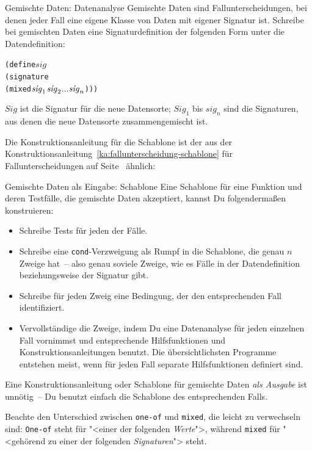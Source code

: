 \begin{konstruktionsanleitung}{Gemischte Daten: Datenanalyse}
  \label{ka:gemischt-datenanalyse}
  Gemischte Daten sind Fallunterscheidungen, bei denen jeder Fall eine
  eigene Klasse von Daten mit eigener Signatur ist.
  Schreibe bei gemischten Daten eine Signaturdefinition der folgenden Form unter die
  Datendefinition:
%
\begin{alltt}
(define \(\mathit{sig}\)
  (signature
    (mixed \(\mathit{sig}\sb{1}\) \(\mathit{sig}\sb{2}\) \(\ldots\) \(\mathit{sig}\sb{n}\))))
\end{alltt}
$\mathit{Sig}$ ist die Signatur für die neue Datensorte; $\mathit{Sig}_1$ bis $\textit{sig}_n$
sind die Signaturen, aus denen die neue
Datensorte zusammengemischt ist.
\end{konstruktionsanleitung}
%
\noindent Die Konstruktionsanleitung für die Schablone ist der aus
der Konstruktionsanleitung~\ref{ka:fallunterscheidung-schablone} für
Fallunterscheidungen auf
Seite~\pageref{ka:fallunterscheidung-schablone} ähnlich:
%
\begin{konstruktionsanleitung}{Gemischte Daten als Eingabe:
    Schablone}
  \label{ka:gemischt-eingabe-schablone}
Eine Schablone für eine Funktion und deren Testfälle, die gemischte
Daten akzeptiert, kannst Du folgendermaßen konstruieren:
%
\begin{itemize}
\item Schreibe Tests für jeden der Fälle.
\item  Schreibe eine \texttt{cond}-Verzweigung als Rumpf in die
  Schablone, die genau $n$ Zweige hat~-- also genau soviele Zweige,
  wie es Fälle in der Datendefinition beziehungsweise der Signatur gibt.
\item Schreibe für jeden Zweig eine Bedingung, der den entsprechenden
  Fall identifiziert.
\item Vervollständige die Zweige, indem Du eine Datenanalyse für
  jeden einzelnen Fall vornimmst und entsprechende Hilfsfunktionen
  und Konstruktionsanleitungen benutzt.
  Die übersichtlichsten Programme entstehen meist, wenn für jeden Fall
  separate Hilfsfunktionen definiert sind.\label{page:separate-mixed-procs}
\end{itemize}
%
\end{konstruktionsanleitung}
%
Eine Konstruktionsanleitung oder Schablone für gemischte Daten
\emph{als Ausgabe} ist unnötig~-- Du benutzt einfach die Schablone
des entsprechenden Falls.

Beachte den Unterschied zwischen \texttt{one-of} und
\texttt{mixed}, die leicht zu verwechseln sind: \texttt{One-of} steht
für "<einer der folgenden \emph{Werte}">, während \texttt{mixed} für
"<gehörend zu einer der folgenden \emph{Signaturen}"> steht.

